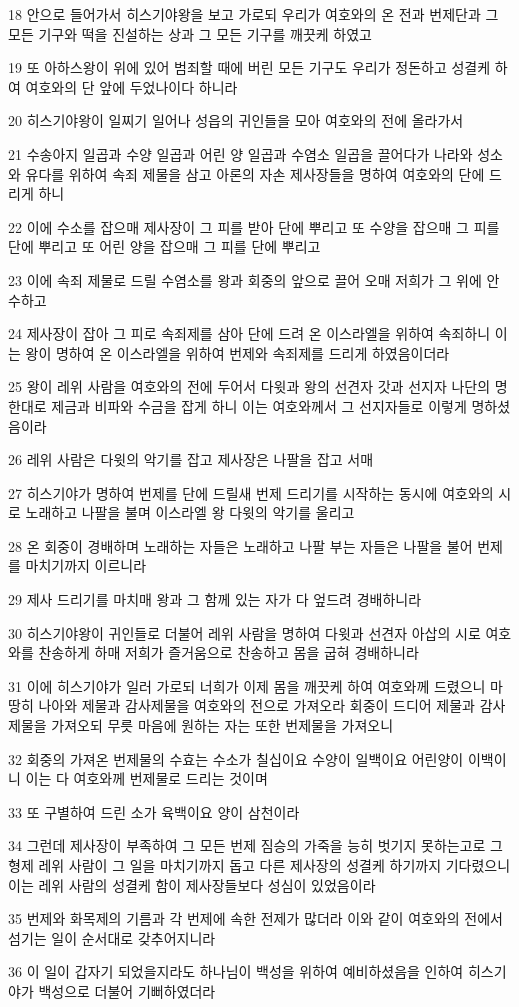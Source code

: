 \par 18 안으로 들어가서 히스기야왕을 보고 가로되 우리가 여호와의 온 전과 번제단과 그 모든 기구와 떡을 진설하는 상과 그 모든 기구를 깨끗케 하였고
\par 19 또 아하스왕이 위에 있어 범죄할 때에 버린 모든 기구도 우리가 정돈하고 성결케 하여 여호와의 단 앞에 두었나이다 하니라
\par 20 히스기야왕이 일찌기 일어나 성읍의 귀인들을 모아 여호와의 전에 올라가서
\par 21 수송아지 일곱과 수양 일곱과 어린 양 일곱과 수염소 일곱을 끌어다가 나라와 성소와 유다를 위하여 속죄 제물을 삼고 아론의 자손 제사장들을 명하여 여호와의 단에 드리게 하니
\par 22 이에 수소를 잡으매 제사장이 그 피를 받아 단에 뿌리고 또 수양을 잡으매 그 피를 단에 뿌리고 또 어린 양을 잡으매 그 피를 단에 뿌리고
\par 23 이에 속죄 제물로 드릴 수염소를 왕과 회중의 앞으로 끌어 오매 저희가 그 위에 안수하고
\par 24 제사장이 잡아 그 피로 속죄제를 삼아 단에 드려 온 이스라엘을 위하여 속죄하니 이는 왕이 명하여 온 이스라엘을 위하여 번제와 속죄제를 드리게 하였음이더라
\par 25 왕이 레위 사람을 여호와의 전에 두어서 다윗과 왕의 선견자 갓과 선지자 나단의 명한대로 제금과 비파와 수금을 잡게 하니 이는 여호와께서 그 선지자들로 이렇게 명하셨음이라
\par 26 레위 사람은 다윗의 악기를 잡고 제사장은 나팔을 잡고 서매
\par 27 히스기야가 명하여 번제를 단에 드릴새 번제 드리기를 시작하는 동시에 여호와의 시로 노래하고 나팔을 불며 이스라엘 왕 다윗의 악기를 울리고
\par 28 온 회중이 경배하며 노래하는 자들은 노래하고 나팔 부는 자들은 나팔을 불어 번제를 마치기까지 이르니라
\par 29 제사 드리기를 마치매 왕과 그 함께 있는 자가 다 엎드려 경배하니라
\par 30 히스기야왕이 귀인들로 더불어 레위 사람을 명하여 다윗과 선견자 아삽의 시로 여호와를 찬송하게 하매 저희가 즐거움으로 찬송하고 몸을 굽혀 경배하니라
\par 31 이에 히스기야가 일러 가로되 너희가 이제 몸을 깨끗케 하여 여호와께 드렸으니 마땅히 나아와 제물과 감사제물을 여호와의 전으로 가져오라 회중이 드디어 제물과 감사제물을 가져오되 무릇 마음에 원하는 자는 또한 번제물을 가져오니
\par 32 회중의 가져온 번제물의 수효는 수소가 칠십이요 수양이 일백이요 어린양이 이백이니 이는 다 여호와께 번제물로 드리는 것이며
\par 33 또 구별하여 드린 소가 육백이요 양이 삼천이라
\par 34 그런데 제사장이 부족하여 그 모든 번제 짐승의 가죽을 능히 벗기지 못하는고로 그 형제 레위 사람이 그 일을 마치기까지 돕고 다른 제사장의 성결케 하기까지 기다렸으니 이는 레위 사람의 성결케 함이 제사장들보다 성심이 있었음이라
\par 35 번제와 화목제의 기름과 각 번제에 속한 전제가 많더라 이와 같이 여호와의 전에서 섬기는 일이 순서대로 갖추어지니라
\par 36 이 일이 갑자기 되었을지라도 하나님이 백성을 위하여 예비하셨음을 인하여 히스기야가 백성으로 더불어 기뻐하였더라

